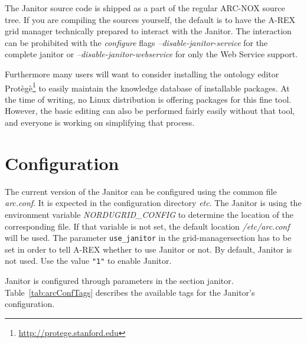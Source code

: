 The Janitor source code is shipped as a part of the regular ARC-NOX
source tree.  If you are compiling the sources yourself, the default
is to have the A-REX grid manager technically prepared to interact
with the Janitor.
The interaction can be prohibited
with the \textit{configure} flags \textit{--disable-janitor-service}
for the complete janitor or \textit{--disable-janitor-webservice} for
only the Web Service support.

Furthermore many users will want to consider installing the ontology editor 
Prot\`eg\`e\footnote{\href{http://protege.stanford.edu}{http://protege.stanford.edu}}
to easily maintain the knowledge database of installable
packages.  At the time of writing, no Linux distribution is offering
packages for this fine tool. However, the basic editing can also be
performed fairly easily without that tool, and everyone is working on
simplifying that process.


\section{Configuration}\label{sec:janitorConfiguration}

The current version of the Janitor can be configured using the
common file \textit{arc.conf}. It is expected in the configuration
directory \textit{etc}. The Janitor is using the environment
variable \textit{NORDUGRID\_CONFIG} to determine the location of the
corresponding file. If that variable is not set, the default location
\textit{/etc/arc.conf} will be used.  The parameter \texttt{use\_janitor} in the
\lbrack grid-manager\rbrack section has to be set in order to tell A-REX
whether to use Janitor or not. By default, Janitor is not used. Use the value
\texttt{"1"} to enable Janitor.

Janitor is configured through parameters
in the section \lbrack janitor\rbrack. Table~\ref{tab:arcConfTags}
describes the available tags for the Janitor's configuration.

